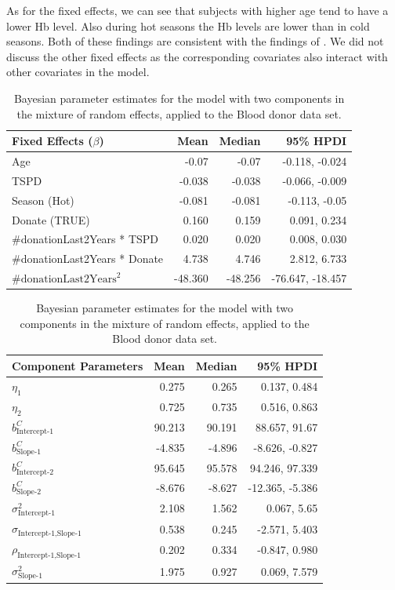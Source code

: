 As for the fixed effects, we can see that subjects with higher age tend to have a lower Hb level. Also during hot seasons the Hb levels are lower than in cold seasons. Both of these findings are consistent with the findings of \citet{nasserinejad_predicting_2013,nasserinejad_prevalence_2015,nasserinejad_prediction_2016}. We did not discuss the other fixed effects as the corresponding covariates also interact with other covariates in the model.

\begin{table}[htb]
\centering
\captionsetup{justification=centering}
\caption{Bayesian parameter estimates for the model with two components in the mixture of random effects, applied to the Blood donor data set.}
\label{table : bhtge_blooddonor_2comp}
\begin{tabular}{@{}lrrr@{}}
\toprule
Fixed Effects ($\beta$) & Mean & Median & 95\% HPDI \\ \midrule
Age &  -0.07 & -0.07 & -0.118, -0.024\\
TSPD & -0.038 & -0.038 & -0.066, -0.009\\
Season (Hot) & -0.081 & -0.081 & -0.113, -0.05\\
Donate (TRUE) & 0.160 & 0.159 & 0.091, 0.234\\
\#donationLast2Years * TSPD & 0.020 & 0.020 & 0.008, 0.030\\
\#donationLast2Years * Donate & 4.738 & 4.746 & 2.812, 6.733\\
$\text{\#donationLast2Years}^2$  & -48.360 & -48.256 & -76.647, -18.457\\ \bottomrule
\end{tabular}

\begin{tabular}{@{}lrrr@{}}
\toprule
Component Parameters & Mean & Median & 95\% HPDI \\ \midrule
$\eta_1$ & 0.275 & 0.265 & 0.137, 0.484\\
$\eta_2$ & 0.725 & 0.735 & 0.516, 0.863\\

$b_\text{Intercept-1}^C$ & 90.213 & 90.191 & 88.657, 91.67\\
$b_\text{Slope-1}^C$ & -4.835 & -4.896 & -8.626, -0.827\\

$b_\text{Intercept-2}^C$ & 95.645 & 95.578 & 94.246, 97.339\\
$b_\text{Slope-2}^C$ & -8.676 & -8.627 & -12.365, -5.386\\

$\sigma^2_\text{Intercept-1}$ & 2.108 & 1.562 & 0.067, 5.65\\
$\sigma_{\text{Intercept-1}, \text{Slope-1}}$ & 0.538 & 0.245 & -2.571, 5.403\\
$\rho_{\text{Intercept-1}, \text{Slope-1}}$ & 0.202 & 0.334 & -0.847, 0.980\\
$\sigma^2_\text{Slope-1}$ & 1.975 & 0.927 & 0.069, 7.579\\


\end{tabular}
\end{table}

